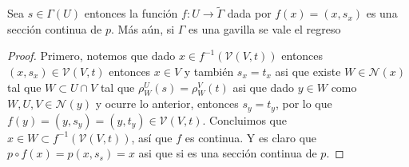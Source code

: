 \documentclass[14pt]{extarticle}
\begin{document}
\begin{proposicion}{}{}
    Sea $s\in \Gamma(U)$ entonces la función
    $f:U\rightarrow \widetilde{\Gamma}$ dada 
    por $f(x)=(x,s_x)$ es una sección continua 
    de $p$. Más aún, si $\Gamma$ es una gavilla
    se vale el regreso
\end{proposicion}
\begin{proof}
    Primero, notemos que dado $x\in f^{-1}(\mathcal{V}(V,t))$ 
    entonces $(x,s_x)\in \mathcal{V}(V,t)$ entonces
    $x\in V$ y también $s_x=t_x$ asi que existe
    $W\in \mathcal{N}(x)$ tal que $W\subset U\cap V$
    tal que $\rho_{W}^{U}(s)= \rho_{W}^{V}(t)$
    asi que dado $y\in W$ como $W,U,V\in\mathcal{N}(y)$
    y ocurre lo anterior, entonces $s_y=t_y$,
    por lo que $f(y)=(y,s_y)=(y,t_y)\in \mathcal{V}(V,t)$.
    Concluimos que $x\in W\subset f^{-1}(\mathcal{V}(V,t))$, 
    así que $f$ es continua.
    Y es claro que $p\circ f(x)= p(x,s_s)=x$ asi que 
    si es una sección continua de $p$.


\end{proof}
\end{document}
